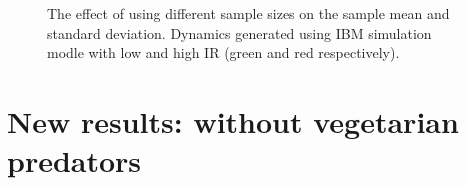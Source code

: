 \begin{figure}[hp]
	\centering
        \caption{The effect of using different sample sizes on the sample mean and standard deviation. Dynamics generated using IBM simulation modle with low and high IR (green and red respectively).}    
    \label{fig:low_v_hi}
\end{figure}

\newpage
\section{New results: without vegetarian predators}

